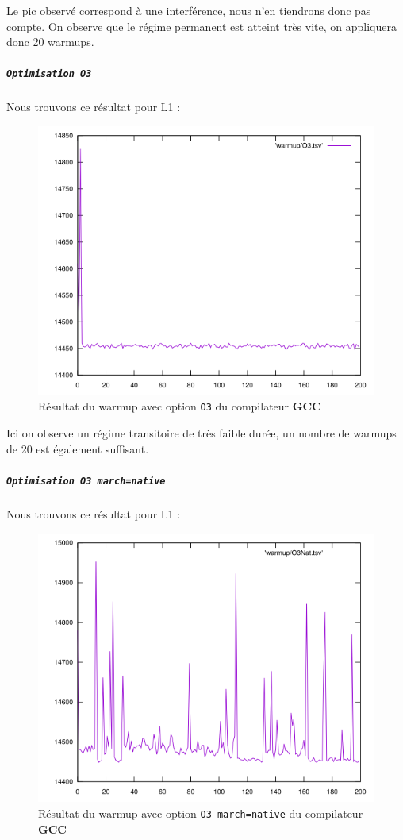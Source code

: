 \documentclass{report}
\begin{document}
      Le pic observé correspond à une interférence, nous n'en tiendrons donc pas compte. On observe que le régime permanent est atteint très vite, on appliquera donc 20 warmups.
      \newpage
      \subparagraph{ \texttt{Optimisation O3}}
    Nous trouvons ce résultat pour L1 :
    \begin{figure}[ht!]
      \centering
      \includegraphics[scale=0.45]{resources/L1/warmup/O3.png}
      \caption{Résultat du warmup avec option \texttt{O3} du compilateur \textbf{GCC}}
    \end{figure}
    
    Ici on observe un régime transitoire de très faible durée, un nombre de warmups de 20 est également suffisant.
    \newpage
\subparagraph{ \texttt{Optimisation O3 march=native}}
  Nous trouvons ce résultat pour L1 :
  \begin{figure}[ht!]
    \centering
\includegraphics[scale=0.45]{resources/L1/warmup/O3Nat.png}
    \caption{Résultat du warmup avec option \texttt{O3 march=native} du compilateur \textbf{GCC}}
  \end{figure}
  
\end{document}
